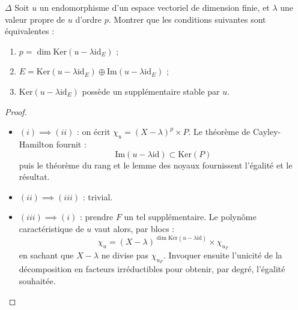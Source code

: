 \documentclass[french,a4paper]{article}
\renewcommand{\ker}{\text{Ker}}
\theoremstyle{plain}
\theoremstyle{definition}
\theoremstyle{remark}
\begin{document}
\begin{ex}{$\Delta$}
	Soit $u$ un endomorphisme d'un espace vectoriel de dimension finie, et $\lambda$ une valeur propre de $u$ d'ordre $p$. Montrer que les conditions suivantes sont équivalentes :
	\begin{enumerate}[label=(\roman*)]
		\item $p=\dim\ker(u-\lambda\text{id}_E)$ ;
		\item $E=\ker(u-\lambda\text{id}_E)\oplus\text{Im}(u-\lambda\text{id}_E)$ ;
		\item $\ker(u-\lambda\text{id}_E)$ possède un supplémentaire stable par $u$.
	\end{enumerate}
\end{ex}
\begin{proof}
	\begin{itemize}
		\item $(i)\implies(ii)$ : on écrit $\chi_u=(X-\lambda)^p\times P$. Le théorème de Cayley-Hamilton fournit : $$\text{Im}(u-\lambda\text{id})\subset\ker(P)$$ puis le théorème du rang et le lemme des noyaux fournissent l'égalité et le résultat.
		\item $(ii)\implies(iii)$ : trivial.
		\item $(iii)\implies(i)$ : prendre $F$ un tel supplémentaire. Le polynôme caractéristique de $u$ vaut alors, par blocs : $$\chi_u=(X-\lambda)^{\dim\ker(u-\lambda\text{id})}\times\chi_{u_F}$$ en sachant que $X-\lambda$ ne divise pas $\chi_{u_F}$. Invoquer ensuite l'unicité de la décomposition en facteurs irréductibles pour obtenir, par degré, l'égalité souhaitée.
	\end{itemize}
\end{proof}
\end{document}
